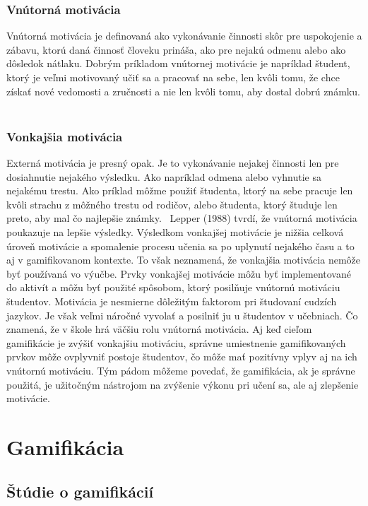 \documentclass[10pt,oneside,slovak,a4paper]{article}
\begin{document}
\subsubsection{Vnútorná motivácia} \label{vnutorna}
Vnútorná motivácia je definovaná ako vykonávanie činnosti skôr pre uspokojenie a zábavu, ktorú daná činnosť človeku prináša, ako pre nejakú odmenu alebo ako dôsledok nátlaku. Dobrým príkladom vnútornej motivácie je napríklad študent, ktorý je veľmi motivovaný učiť sa a pracovať na sebe, len kvôli tomu, že chce získať nové vedomosti a zručnosti a nie len kvôli tomu, aby dostal dobrú známku. ~\cite{ryan2000intrinsic}

\subsubsection{Vonkajšia motivácia} \label{vonkajsia}
Externá motivácia je presný opak. Je to vykonávanie nejakej činnosti len pre dosiahnutie nejakého výsledku. Ako napríklad odmena alebo vyhnutie sa nejakému trestu. Ako príklad môžme použiť študenta, ktorý na sebe pracuje len kvôli strachu z môžného trestu od rodičov, alebo študenta, ktorý študuje len preto, aby mal čo najlepšie známky.~\cite{ryan2000intrinsic}
Lepper (1988) tvrdí, že vnútorná motivácia poukazuje na lepšie výsledky. Výsledkom vonkajšej motivácie je nižšia celková úroveň motivácie a spomalenie procesu učenia sa po uplynutí nejakého času a to aj v gamifikovanom kontexte. To však neznamená, že vonkajšia motivácia nemôže byť používaná vo výučbe. Prvky vonkajšej motivácie môžu byť implementované do aktivít a môžu byť použité spôsobom, ktorý posilňuje vnútornú motiváciu študentov. Motivácia je nesmierne dôležitým faktorom pri študovaní cudzích jazykov. Je však veľmi náročné vyvolať a posilniť ju u študentov v učebniach. Čo znamená, že v škole hrá väčšiu rolu vnútorná motivácia. Aj keď cieľom gamifikácie je zvýšiť vonkajšiu motiváciu, správne umiestnenie gamifikovaných prvkov môže ovplyvniť postoje študentov, čo môže mať pozitívny vplyv aj na ich vnútornú motiváciu. Tým pádom môžeme povedať, že gamifikácia, ak je správne použitá, je užitočným nástrojom na zvýšenie výkonu pri učení sa, ale aj zlepšenie motivácie. 
~\cite{garland2015gamification}

\section{Gamifikácia}\label{gamificationsection}
\subsection{Štúdie o gamifikácií} \label{studies}
\end{document}
